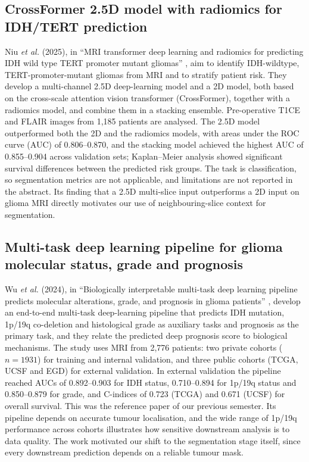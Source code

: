 \subsection{CrossFormer 2.5D model with radiomics for IDH/TERT prediction}
Niu \emph{et al.} (2025), in ``MRI transformer deep learning and radiomics for predicting IDH wild type TERT promoter mutant gliomas'' \cite{niu2025}, aim to identify IDH-wildtype, TERT-promoter-mutant gliomas from MRI and to stratify patient risk. They develop a multi-channel 2.5D deep-learning model and a 2D model, both based on the cross-scale attention vision transformer (CrossFormer), together with a radiomics model, and combine them in a stacking ensemble. Pre-operative T1CE and FLAIR images from 1,185 patients are analysed. The 2.5D model outperformed both the 2D and the radiomics models, with areas under the ROC curve (AUC) of 0.806--0.870, and the stacking model achieved the highest AUC of 0.855--0.904 across validation sets; Kaplan--Meier analysis showed significant survival differences between the predicted risk groups. The task is classification, so segmentation metrics are not applicable, and limitations are not reported in the abstract. Its finding that a 2.5D multi-slice input outperforms a 2D input on glioma MRI directly motivates our use of neighbouring-slice context for segmentation.

\subsection{Multi-task deep learning pipeline for glioma molecular status, grade and prognosis}
Wu \emph{et al.} (2024), in ``Biologically interpretable multi-task deep learning pipeline predicts molecular alterations, grade, and prognosis in glioma patients'' \cite{wu2024}, develop an end-to-end multi-task deep-learning pipeline that predicts IDH mutation, 1p/19q co-deletion and histological grade as auxiliary tasks and prognosis as the primary task, and they relate the predicted deep prognosis score to biological mechanisms. The study uses MRI from 2,776 patients: two private cohorts ($n = 1931$) for training and internal validation, and three public cohorts (TCGA, UCSF and EGD) for external validation. In external validation the pipeline reached AUCs of 0.892--0.903 for IDH status, 0.710--0.894 for 1p/19q status and 0.850--0.879 for grade, and C-indices of 0.723 (TCGA) and 0.671 (UCSF) for overall survival. This was the reference paper of our previous semester. Its pipeline depends on accurate tumour localisation, and the wide range of 1p/19q performance across cohorts illustrates how sensitive downstream analysis is to data quality. The work motivated our shift to the segmentation stage itself, since every downstream prediction depends on a reliable tumour mask.

